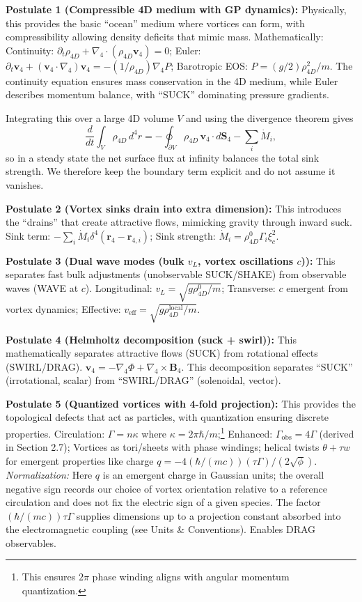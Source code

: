 \begin{tcolorbox}
\textbf{Postulate 1 (Compressible 4D medium with GP dynamics):} Physically, this provides the basic ``ocean'' medium where vortices can form, with compressibility allowing density deficits that mimic mass. Mathematically: Continuity: $\partial_t \rho_{4D} + \nabla_4 \cdot (\rho_{4D} \mathbf{v}_4) = 0$; Euler: $\partial_t \mathbf{v}_4 + (\mathbf{v}_4 \cdot \nabla_4) \mathbf{v}_4 = -(1/\rho_{4D}) \nabla_4 P$; Barotropic EOS: $P = (g/2) \rho_{4D}^2/m$. The continuity equation ensures mass conservation in the 4D medium, while Euler describes momentum balance, with ``SUCK'' dominating pressure gradients.

Integrating this over a large 4D volume $V$ and using the divergence theorem gives
\[\frac{d}{dt}\int_V \rho_{4D}\, d^4r = - \oint_{\partial V} \rho_{4D} \, \mathbf v_4\cdot d\mathbf S_4 
- \sum_i \dot M_i,\]
so in a steady state the net surface flux at infinity balances the total sink strength. We therefore keep the boundary term explicit and do not assume it vanishes.


\textbf{Postulate 2 (Vortex sinks drain into extra dimension):} This introduces the ``drains'' that create attractive flows, mimicking gravity through inward suck. Sink term: $-\sum_i \dot{M}_i \delta^4(\mathbf{r}_4 - \mathbf{r}_{4,i})$; Sink strength: $\dot{M}_i = \rho_{4D}^0 \Gamma_i \xi_c^2$.

\textbf{Postulate 3 (Dual wave modes (bulk $v_L$, vortex oscillations $c$)):} This separates fast bulk adjustments (unobservable SUCK/SHAKE) from observable waves (WAVE at $c$). Longitudinal: $v_L = \sqrt{g \rho_{4D}^0 / m}$; Transverse: $c$ emergent from vortex dynamics; Effective: $v_{\text{eff}} = \sqrt{g \rho_{4D}^{\text{local}} / m}$.

\textbf{Postulate 4 (Helmholtz decomposition (suck + swirl)):} This mathematically separates attractive flows (SUCK) from rotational effects (SWIRL/DRAG). $\mathbf{v}_4 = -\nabla_4 \Phi + \nabla_4 \times \mathbf{B}_4$. This decomposition separates ``SUCK'' (irrotational, scalar) from ``SWIRL/DRAG'' (solenoidal, vector).

\textbf{Postulate 5 (Quantized vortices with 4-fold projection):} This provides the topological defects that act as particles, with quantization ensuring discrete properties. Circulation: $\Gamma = n \kappa$ where $\kappa = 2\pi \hbar / m$;\footnote{This ensures $2\pi$ phase winding aligns with angular momentum quantization.} Enhanced: $\Gamma_{\text{obs}} = 4 \Gamma$ (derived in Section 2.7); Vortices as tori/sheets with phase windings; helical twists $\theta + \tau w$ for emergent properties like charge $q = -4 (\hbar / (m c)) (\tau \Gamma) / (2 \sqrt{\phi})$. \textit{Normalization:} Here $q$ is an emergent charge in Gaussian units; the overall negative sign records our choice of vortex orientation relative to a reference circulation and does not fix the electric sign of a given species. The factor $(\hbar/(m c))\tau\Gamma$ supplies dimensions up to a projection constant absorbed into the electromagnetic coupling (see Units \& Conventions). Enables DRAG observables.


\end{tcolorbox}
